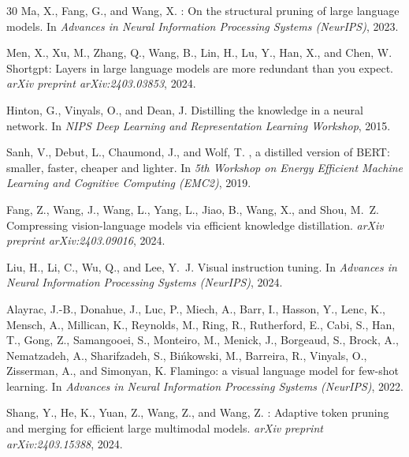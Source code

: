 \documentclass[11pt]{article}
\begin{document}
\begin{thebibliography}{30}
Ma, X., Fang, G., and Wang, X.
: On the structural pruning of large language models.
\newblock In \emph{Advances in Neural Information Processing Systems (NeurIPS)}, 2023.

Men, X., Xu, M., Zhang, Q., Wang, B., Lin, H., Lu, Y., Han, X., and Chen, W.
\newblock Shortgpt: Layers in large language models are more redundant than you expect.
\newblock \emph{arXiv preprint arXiv:2403.03853}, 2024.

Hinton, G., Vinyals, O., and Dean, J.
\newblock Distilling the knowledge in a neural network.
\newblock In \emph{NIPS Deep Learning and Representation Learning Workshop}, 2015.

Sanh, V., Debut, L., Chaumond, J., and Wolf, T.
, a distilled version of {BERT}: smaller, faster, cheaper and lighter.
\newblock In \emph{5th Workshop on Energy Efficient Machine Learning and Cognitive Computing (EMC2)}, 2019.

Fang, Z., Wang, J., Wang, L., Yang, L., Jiao, B., Wang, X., and Shou, M.~Z.
\newblock Compressing vision-language models via efficient knowledge distillation.
\newblock \emph{arXiv preprint arXiv:2403.09016}, 2024.

Liu, H., Li, C., Wu, Q., and Lee, Y.~J.
\newblock Visual instruction tuning.
\newblock In \emph{Advances in Neural Information Processing Systems (NeurIPS)}, 2024.

Alayrac, J.-B., Donahue, J., Luc, P., Miech, A., Barr, I., Hasson, Y., Lenc, K., Mensch, A., Millican, K., Reynolds, M., Ring, R., Rutherford, E., Cabi, S., Han, T., Gong, Z., Samangooei, S., Monteiro, M., Menick, J., Borgeaud, S., Brock, A., Nematzadeh, A., Sharifzadeh, S., Bińkowski, M., Barreira, R., Vinyals, O., Zisserman, A., and Simonyan, K.
\newblock Flamingo: a visual language model for few-shot learning.
\newblock In \emph{Advances in Neural Information Processing Systems (NeurIPS)}, 2022.

Shang, Y., He, K., Yuan, Z., Wang, Z., and Wang, Z.
: Adaptive token pruning and merging for efficient large multimodal models.
\newblock \emph{arXiv preprint arXiv:2403.15388}, 2024.


\end{thebibliography}
\end{document}
